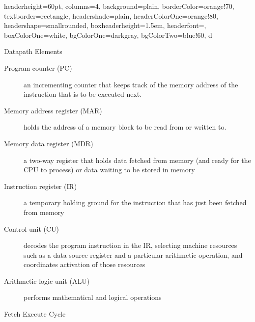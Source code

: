 \documentclass[landscape,fontscale=1,margin=0.2cm,paperwidth=60truecm, paperheight=34truecm,debug]{baposter}
\begin{document}
\begin{poster}{
  headerheight=60pt,
  columns=4,
  background=plain,
  borderColor=orange!70,
  textborder=rectangle,
  headershade=plain,
  headerColorOne=orange!80,
  headershape=smallrounded,
  boxheaderheight=1.5em,
  headerfont={},
  boxColorOne=white,
  bgColorOne=darkgray,
  bgColorTwo=blue!60,
}{}{\Large{\color{white}{Single Cycle Datapath}}}{}{d}

\begin{posterbox}[column=0]{Datapath Elements}
\begin{description}
\item[Program counter (PC)] an incrementing counter that keeps track of the memory address of the instruction that is to be executed next.
\item[Memory address register (MAR)] holds the address of a memory block to be read from or written to.
\item[Memory data register (MDR)] a two-way register that holds data fetched from memory (and ready for the CPU to process) or data waiting to be stored in memory
\item[Instruction register (IR)] a temporary holding ground for the instruction that has just been fetched from memory
\item[Control unit (CU)] decodes the program instruction in the IR, selecting machine resources such as a data source register and a particular arithmetic operation, and coordinates activation of those resources
\item[Arithmetic logic unit (ALU)] performs mathematical and logical operations
\end{description}
\end{posterbox}
\begin{posterbox}[column=0,below=auto,textborder=rounded]{Fetch Execute Cycle}
\begin{center}

\end{center}
\end{posterbox}
\end{poster}
\end{document}
